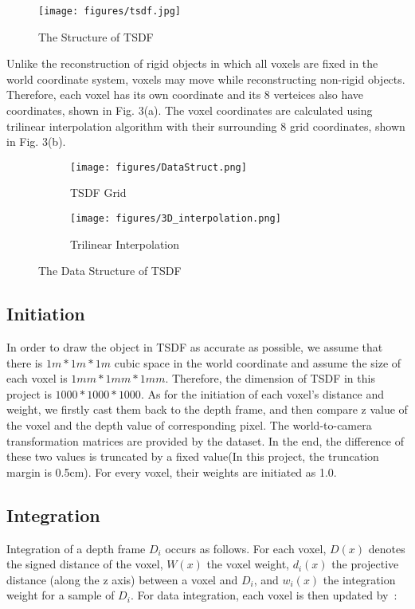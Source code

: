 \documentclass{article}
\begin{document}
\begin{figure}[htp]
\centering
\texttt{[image: figures/tsdf.jpg]}
\caption{The Structure of TSDF}
\label{fig:TSDF}
\end{figure}

Unlike the reconstruction of rigid objects in which all voxels are fixed in the world coordinate system, voxels may move while reconstructing non-rigid objects. Therefore, each voxel has its own coordinate and its 8 verteices also have coordinates, shown in Fig. 3(a). The voxel coordinates are calculated using trilinear interpolation algorithm with their surrounding 8 grid coordinates, shown in Fig. 3(b). 

\begin{figure}
\centering
\begin{subfigure}{.65\textwidth}
  \centering
  \texttt{[image: figures/DataStruct.png]}
  \caption{TSDF Grid}
  \label{fig:sub1}
\end{subfigure}%
\begin{subfigure}{.35\textwidth}
  \centering
  \texttt{[image: figures/3D\_interpolation.png]}
  \caption{Trilinear Interpolation}
  \label{fig:sub2}
\end{subfigure}
\caption{The Data Structure of TSDF}
\label{fig:test}
\end{figure}


\subsection{Initiation}
In order to draw the object in TSDF as accurate as possible, we assume that there is \(1m * 1m * 1m \) cubic space in the world coordinate and assume the size of each voxel is \(1mm * 1mm * 1mm \). Therefore, the dimension of TSDF in this project is \(1000 * 1000 * 1000\). As for the initiation of each voxel's distance and weight, we firstly cast them back to the depth frame, and then compare z value of the voxel and the depth value of corresponding pixel. The world-to-camera transformation matrices are provided by the dataset. In the end, the difference of these two values is truncated by a fixed value(In this project, the truncation margin is 0.5cm). For every voxel, their weights are initiated as 1.0.

\subsection{Integration}
Integration of a depth frame $D_i$ occurs as follows. For each voxel, $D{(x)}$ denotes the signed distance of the voxel,  $W{(x)}$ the voxel weight, $d_i{(x)}$ the projective distance (along the z axis) between a voxel and $D_i$, and $w_i{(x)}$ the integration weight for a sample of $D_i$. For data integration, each voxel is then updated by~\cite{dai2017bundlefusion}:
\end{document}
